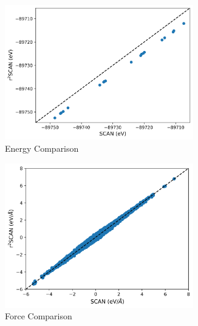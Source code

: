 \begin{figure}[tbhp]
  \centering
  \begin{subfigure}{0.48\textwidth}
    \centering

    \includegraphics[width=0.9\textwidth]{images/scan_vs_r2scan/energy_compare.png}
    \caption{Energy Comparison}
    \label{fig:scan_r2scan_E}
  \end{subfigure}
  \hfill
  \begin{subfigure}{0.48\textwidth}
    \centering

    \includegraphics[width=0.9\textwidth]{images/scan_vs_r2scan/force_compare.png}
    \caption{Force Comparison}
    \label{fig:scan_r2scan_F}
  \end{subfigure}
  \hfill
  \begin{subfigure}{0.9\textwidth}
    \centering


\end{subfigure}
\end{figure}
